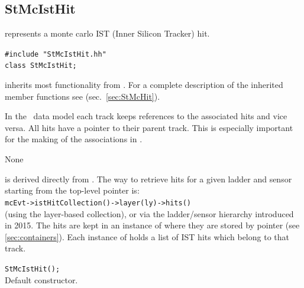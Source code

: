 %
%
\subsection{StMcIstHit}
 
\label{sec:StMcIstHit}
\begin{Entry}
\item[Summary]
     represents a monte carlo IST (Inner Silicon Tracker) hit.

\item[Synopsis]
    \verb+#include "StMcIstHit.hh"+\\
    \verb+class StMcIstHit;+\\

\item[Description]
     inherits most functionality from .
    For a complete description of the inherited member functions see
     (sec.~\ref{sec:StMcHit}).

    In the \StMcEvent\ data model each track keeps references to the
    associated hits and vice versa.  All hits have a pointer to their
    parent track.  This is especially important for the making of the
    associations in \StAssociationMaker.

\item[Persistence]
    None

\item[Related Classes]
     is derived directly from .
    The way to retrieve hits for a given ladder and sensor starting
    from the top-level  pointer is:\\
    \verb+mcEvt->istHitCollection()->layer(ly)->hits()+\\
    (using the layer-based collection), or via the ladder/sensor hierarchy
    introduced in 2015.
    The hits are kept in an instance of 
    where they are stored by pointer (see \ref{sec:containers}).
    Each instance of  holds a list of IST hits
    which belong to that track.

\item[Public\\ Constructors]
    \verb+StMcIstHit();+\\
    Default constructor.


\end{Entry}
